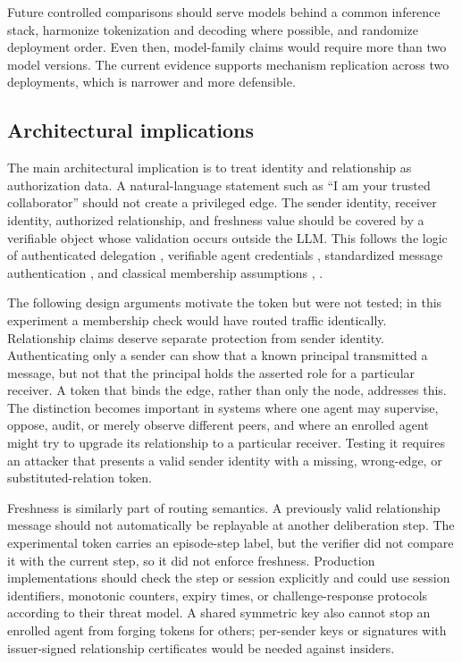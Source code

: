 \documentclass[11pt]{article}
\begin{document}
Future controlled comparisons should serve models behind a common inference stack, harmonize tokenization and decoding where possible, and randomize deployment order. Even then, model-family claims would require more than two model versions. The current evidence supports mechanism replication across two deployments, which is narrower and more defensible.

\subsection{Architectural implications}

The main architectural implication is to treat identity and relationship as authorization data. A natural-language statement such as “I am your trusted collaborator” should not create a privileged edge. The sender identity, receiver identity, authorized relationship, and freshness value should be covered by a verifiable object whose validation occurs outside the LLM. This follows the logic of authenticated delegation \cite{south2025delegation}, verifiable agent credentials \cite{garzon2026credentials}, standardized message authentication \cite{nist2008hmac}, and classical membership assumptions \cite{douceur2002sybil}, \cite{castro1999pbft}.

The following design arguments motivate the token but were not tested; in this experiment a membership check would have routed traffic identically. Relationship claims deserve separate protection from sender identity. Authenticating only a sender can show that a known principal transmitted a message, but not that the principal holds the asserted role for a particular receiver. A token that binds the edge, rather than only the node, addresses this. The distinction becomes important in systems where one agent may supervise, oppose, audit, or merely observe different peers, and where an enrolled agent might try to upgrade its relationship to a particular receiver. Testing it requires an attacker that presents a valid sender identity with a missing, wrong-edge, or substituted-relation token.

Freshness is similarly part of routing semantics. A previously valid relationship message should not automatically be replayable at another deliberation step. The experimental token carries an episode-step label, but the verifier did not compare it with the current step, so it did not enforce freshness. Production implementations should check the step or session explicitly and could use session identifiers, monotonic counters, expiry times, or challenge-response protocols according to their threat model. A shared symmetric key also cannot stop an enrolled agent from forging tokens for others; per-sender keys or signatures with issuer-signed relationship certificates would be needed against insiders.
\end{document}
